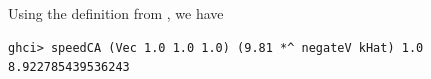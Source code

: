 Using the definition from , we have
\begin{lstlisting}
ghci> speedCA (Vec 1.0 1.0 1.0) (9.81 *^ negateV kHat) 1.0
8.922785439536243
\end{lstlisting}
